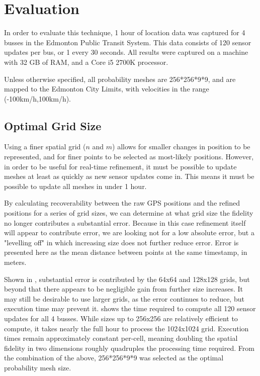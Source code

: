 \section{Evaluation}

In order to evaluate this technique, 1 hour of location data was captured for 4 busses in the Edmonton Public Transit System. This data consists of 120 sensor updates per bus, or 1 every 30 seconds. All results were captured on a machine with 32 GB of RAM, and a Core i5 2700K processor.

Unless otherwise specified, all probability meshes are 256*256*9*9, and are mapped to the Edmonton City Limits, with velocities in the range (-100km/h,100km/h).

\subsection{Optimal Grid Size}
Using a finer spatial grid ($n$ and $m$) allows for smaller changes in position to be represented, and for finer points to be selected as most-likely positions.
However, in order to be useful for real-time refinement, it must be possible to update meshes at least as quickly as new sensor updates come in. This means it must be possible to update all meshes in under 1 hour.

By calculating recoverability between the raw GPS positions and the refined positions for a series of grid sizes, we can determine at what grid size the fidelity no longer contributes a substantial error. Because in this case refinement itself will appear to contribute error, we are looking not for a low absolute error, but a "levelling off" in which increasing size does not further reduce error.
Error is presented here as the mean distance between points at the same timestamp, in meters.



Shown in , substantial error is contributed by the 64x64 and 128x128 grids, but beyond that there appears to be negligible gain from further size increases. It may still be desirable to use larger grids, as the error continues to reduce, but execution time may prevent it.  shows the time required to compute all 120 sensor updates for all 4 busses. While sizes up to 256x256 are relatively efficient to compute, it takes nearly the full hour to process the 1024x1024 grid.
Execution times remain approximately constant per-cell, meaning doubling the spatial fidelity in two dimensions roughly quadruples the processing time required. From the combination of the above, 256*256*9*9 was selected as the optimal probability mesh size.

